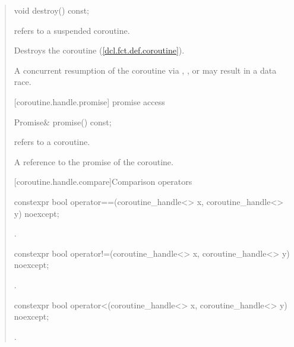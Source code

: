 \begin{quote}
\begin{itemdecl}
  void destroy() const;
\end{itemdecl}
\begin{itemdescr}
  \pnum
  \precondition {} refers to a suspended coroutine.
  
  \pnum
  \effects Destroys the coroutine (\ref{dcl.fct.def.coroutine}).
  
\pnum
  \enternote A concurrent resumption of the coroutine via , , or  may result in a data race.
\end{itemdescr}

[coroutine.handle.promise]{ promise access}
\begin{itemdecl}
  Promise& promise() const;		
\end{itemdecl}

\begin{itemdescr}
  \pnum
  \precondition {} refers to a coroutine.
  
  \pnum
  \returns A reference to the promise of the coroutine.
\end{itemdescr}

[coroutine.handle.compare]{Comparison operators}

\begin{itemdecl}
  constexpr bool operator==(coroutine_handle<> x, coroutine_handle<> y) noexcept;
\end{itemdecl}

\begin{itemdescr}
  \pnum
  \returns {}.
\end{itemdescr}

\begin{itemdecl}
  constexpr bool operator!=(coroutine_handle<> x, coroutine_handle<> y) noexcept;
\end{itemdecl}

\begin{itemdescr}
  \pnum
  \returns {}.
\end{itemdescr}

\begin{itemdecl}
  constexpr bool operator<(coroutine_handle<> x, coroutine_handle<> y) noexcept;
\end{itemdecl}

\begin{itemdescr}
  \pnum
  \returns {}.
\end{itemdescr}


\end{quote}

